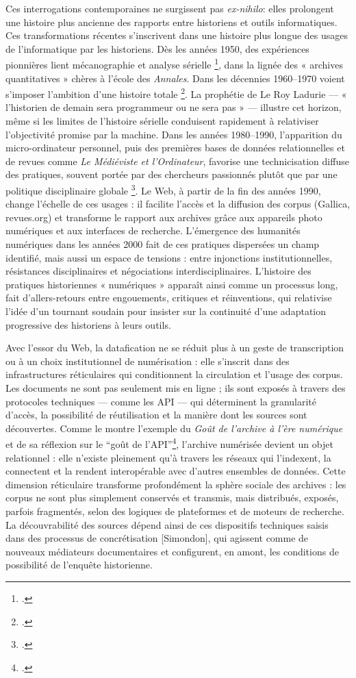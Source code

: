 Ces interrogations contemporaines ne surgissent pas \emph{ex-nihilo}: elles prolongent une histoire plus ancienne des rapports entre historiens et outils informatiques. Ces transformations récentes s’inscrivent dans une histoire plus longue des usages de l’informatique par les historiens. Dès les années 1950, des expériences pionnières lient mécanographie et analyse sérielle \footcite[][]{daumard}, dans la lignée des « archives quantitatives » chères à l’école des \emph{Annales}. Dans les décennies 1960–1970 voient s’imposer l’ambition d’une histoire totale \footcite[][]{poublanc}. La prophétie de Le Roy Ladurie — « l’historien de demain sera programmeur ou ne sera pas » — illustre cet horizon, même si les limites de l’histoire sérielle conduisent rapidement à relativiser l’objectivité promise par la machine. Dans les années 1980–1990, l’apparition du micro-ordinateur personnel, puis des premières bases de données relationnelles et de revues comme \emph{Le Médiéviste et l’Ordinateur}, favorise une technicisation diffuse des pratiques, souvent portée par des chercheurs passionnés plutôt que par une politique disciplinaire globale \footcite[][]{poublanc}. Le Web, à partir de la fin des années 1990, change l’échelle de ces usages : il facilite l’accès et la diffusion des corpus (Gallica, revues.org) et transforme le rapport aux archives grâce aux appareils photo numériques et aux interfaces de recherche. L’émergence des humanités numériques dans les années 2000 fait de ces pratiques dispersées un champ identifié, mais aussi un espace de tensions : entre injonctions institutionnelles, résistances disciplinaires et négociations interdisciplinaires. L’histoire des pratiques historiennes « numériques » apparaît ainsi comme un processus long, fait d’allers-retours entre engouements, critiques et réinventions, qui relativise l’idée d’un tournant soudain pour insister sur la continuité d’une adaptation progressive des historiens à leurs outils.

Avec l’essor du Web, la datafication ne se réduit plus à un geste de transcription ou à un choix institutionnel de numérisation : elle s’inscrit dans des infrastructures réticulaires qui conditionnent la circulation et l’usage des corpus. Les documents ne sont pas seulement mis en ligne ; ils sont exposés à travers des protocoles techniques — comme les API — qui déterminent la granularité d’accès, la possibilité de réutilisation et la manière dont les sources sont découvertes. Comme le montre l’exemple du \emph{Goût de l’archive à l’ère numérique} et de sa réflexion sur le \enquote{goût de l’API}\footcite[][]{goutapi}, l’archive numérisée devient un objet relationnel : elle n’existe pleinement qu’à travers les réseaux qui l’indexent, la connectent et la rendent interopérable avec d’autres ensembles de données. Cette dimension réticulaire transforme profondément la sphère sociale des archives : les corpus ne sont plus simplement conservés et transmis, mais distribués, exposés, parfois fragmentés, selon des logiques de plateformes et de moteurs de recherche. La découvrabilité des sources dépend ainsi de ces dispositifs techniques saisis dans des processus de concrétisation [Simondon], qui agissent comme de nouveaux médiateurs documentaires et configurent, en amont, les conditions de possibilité de l’enquête historienne. 

